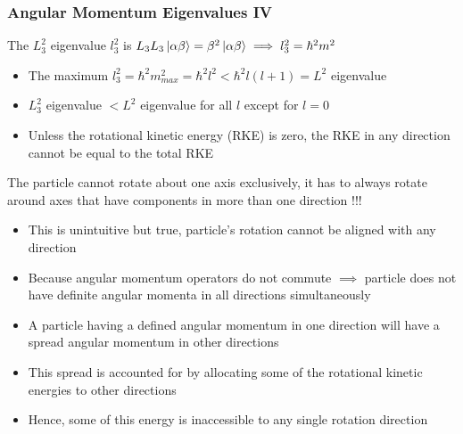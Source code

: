 \documentclass[8pt,t,mathserif,aspectratio=169]{beamer}
\begin{document}
\begin{frame}
  \frametitle{Angular Momentum Eigenvalues IV}
  \vspace{1mm}
  The $L_{3}^2$ eigenvalue $l_{3}^{2}$ is $L_3 L_3 \ket{\alpha \beta} = \beta^2 \ket{\alpha \beta} \implies l_{3}^{2} = \hbar^2 m^2$
  \begin{itemize}
    \item The maximum $l_{3}^{2} = \hbar^2 m_{max}^{2} = \hbar^2 l^2 < \hbar^2 l(l + 1) = L^2$ eigenvalue
    \item $L_{3}^{2}$ eigenvalue $< L^2$ eigenvalue for all $l$ except for $l = 0$
    \item Unless the rotational kinetic energy (RKE) is zero, the RKE in any direction cannot be equal to the total RKE
  \end{itemize}
    The particle cannot rotate about one axis exclusively, it has to always rotate around axes that have components in more than one direction !!!
  \begin{itemize}
    \item This is unintuitive but true, particle's rotation cannot be aligned with any direction
    \item Because angular momentum operators do not commute $\implies$ particle does not have definite angular momenta in all directions simultaneously
    \item A particle having a defined angular momentum in one direction will have a spread angular momentum in other directions
    \item This spread is accounted for by allocating some of the rotational kinetic energies to other directions
    \item Hence, some of this energy is inaccessible to any single rotation direction 
  \end{itemize}
\end{frame}
\end{document}
